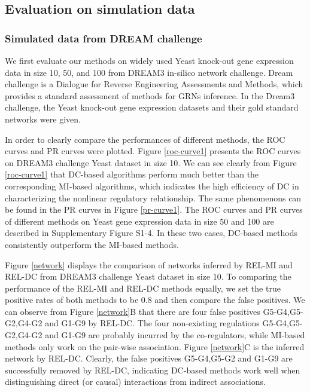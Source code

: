 \documentclass{bioinfo}
\begin{document}
\subsection{Evaluation on simulation data}
\subsubsection{Simulated data from DREAM challenge}
We first evaluate our methods on widely used Yeast knock-out gene
expression data in size 10, 50, and 100 from DREAM3 in-silico
network challenge\citep{marbach2009generating, marbach2010revealing,
prill2010towards}. Dream challenge is a Dialogue for Reverse
Engineering Assessments and Methods, which provides a standard
assessment of methods for GRNs inference. In the Dream3 challenge,
the Yeast knock-out gene expression datasets and their gold standard
networks were given.

In order to clearly compare the performances of different methods,
the ROC curves and PR curves were plotted.  Figure \ref{roc-curve1}
presents the ROC curves on DREAM3 challenge Yeast dataset in size
10. We can see clearly from Figure \ref{roc-curve1} that DC-based
algorithms perform much better than the corresponding MI-based
algorithms, which indicates the high efficiency of DC in
characterizing the nonlinear regulatory relationship.
The same phenomenons can be found in the PR curves in Figure
\ref{pr-curve1}. The ROC curves and PR curves of different methods
on Yeast gene expression data in size 50 and 100 are described in
Supplementary Figure S1-4. In these two cases, DC-based methods
consistently outperform  the MI-based methods.

Figure \ref{network} displays the comparison of networks inferred by  REL-MI and REL-DC from DREAM3 challenge Yeast dataset in size 10. To comparing the performance of the REL-MI and REL-DC methods equally, we set the true positive rates of both methods to be 0.8 and then compare the false positives. We can observe from Figure \ref{network}B that there are four false positives G5-G4,G5-G2,G4-G2 and G1-G9 by  REL-DC.  The four non-existing regulations G5-G4,G5-G2,G4-G2 and G1-G9 are probably incurred by the co-regulators, while MI-based methods only work on the pair-wise association. Figure \ref{network}C is the inferred network by REL-DC. Clearly, the false positives G5-G4,G5-G2 and G1-G9 are successfully removed by REL-DC, indicating  DC-based methods work well when distinguishing direct (or causal) interactions from indirect associations.
\end{document}
